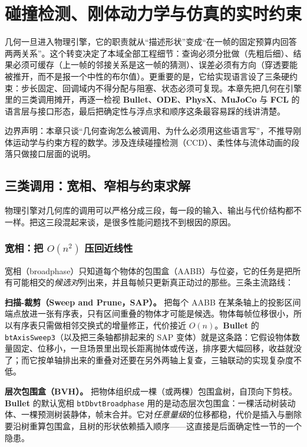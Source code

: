\documentclass[12pt,a4paper,fontset=fandol]{ctexbook}
\newcommand{\Tp}[1]{\texttt{#1}}
\newcommand{\Bk}{\allowbreak}
\newcommand{\Lib}[1]{\textbf{#1}}
\begin{document}
\chapter{碰撞检测、刚体动力学与仿真的实时约束}

几何一旦进入物理引擎，它的职责就从``描述形状''变成``在一帧的固定预算内回答两两关系''。这个转变决定了本域全部工程细节：查询必须分批做（先粗后细）、结果必须可缓存（上一帧的邻接关系是这一帧的猜测）、误差必须有方向（穿透要能被推开，而不是报一个中性的布尔值）。更重要的是，它给实现语言设了三条硬约束：步长固定、回调域内不得分配与阻塞、状态必须可复现。本章先把几何在引擎里的三类调用摊开，再逐一检视 \Lib{Bullet}、\Lib{ODE}、\Lib{PhysX}、\Lib{MuJoCo} 与 \Lib{FCL} 的语言层与接口形态，最后把确定性与浮点求和顺序这条最容易踩的线讲清楚。

边界声明：本章只谈``几何查询怎么被调用、为什么必须用这些语言写''，不推导刚体运动学与约束方程的数学。涉及连续碰撞检测（CCD）、柔性体与流体动画的段落只做接口层面的说明。

\section{三类调用：宽相、窄相与约束求解}

物理引擎对几何库的调用可以严格分成三段，每一段的输入、输出与代价结构都不一样。把这三段混起来谈，是很多性能问题找不到根因的原因。

\subsection{宽相：把 $O(n^{2})$ 压回近线性}

宽相（broadphase）只知道每个物体的包围盒（AABB）与位姿，它的任务是把所有可能相交的\emph{候选对}列出来，并且每帧只更新真正动过的那些。三条主流路线：

\textbf{扫描-裁剪（Sweep and Prune，SAP）。} 把每个 AABB 在某条轴上的投影区间端点放进一张有序表，只有区间重叠的物体才可能是候选。物体每帧位移很小，所以有序表只需做相邻交换式的增量修正，代价接近 $O(n)$。\Lib{Bullet} 的 \Tp{btAxis\Bk Sweep3}（以及把三条轴都排起来的 SAP 变体）就是这条路：它假设物体数量固定、位移小，一旦场景里出现长距离抛体或传送，排序要大幅回移，收益就没了；而它按单轴排出来的重叠对还要在另外两轴上复查，三轴联动的实现复杂度不低。

\textbf{层次包围盒（BVH）。} 把物体组织成一棵（或两棵）包围盒树，自顶向下剪枝。\Lib{Bullet} 的默认宽相 \Tp{btDbvt\Bk Broadphase} 用的是动态层次包围盒：一棵活动树装动体、一棵预测树装静体，帧末合并。它对\emph{任意量级}的位移都稳，代价是插入与删除要沿树重算包围盒，且树的形状依赖插入顺序——这直接是后面确定性一节的一个隐患。
\end{document}
